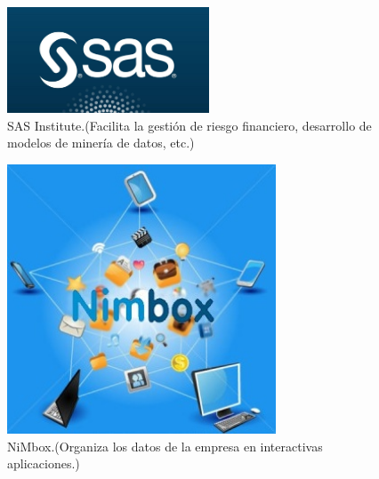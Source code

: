 \documentclass[a4paper,12pt,twocolumn]{article}
\begin{document}
\begin{figure}[h!]
\centering
\includegraphics[width=6cm]{./Imagenes/BIimagen19}
\caption{\label{fig:01}SAS Institute.(Facilita la gestión de riesgo financiero, desarrollo de modelos de minería de datos, etc.)}
\end{figure}

\begin{figure}[h!]
\centering
\includegraphics[width=8cm]{./Imagenes/BIimagen20}
\caption{\label{fig:01}NiMbox.(Organiza los datos de la empresa en interactivas aplicaciones.)}
\end{figure}
\textbf{}\\
\textbf{}\\
\end{document}
